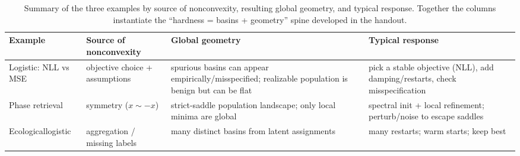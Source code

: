 \documentclass[11pt]{article}
\makeatletter
\def@path{{../../}{../}{Lecture Tex/}}
\makeatother
\begin{document}
\begin{table}[t]
  \centering
  \small
  \setlength{\tabcolsep}{4pt}
  \begin{tabular}{@{}p{}p{}p{}p{}@{}}
    \toprule
    Example & Source of nonconvexity & Global geometry & Typical response \\
    \midrule
    Logistic: NLL vs MSE & objective choice + assumptions & spurious basins can appear empirically/misspecified; realizable population is benign but can be flat & pick a stable objective (NLL), add damping/restarts, check misspecification \\
    Phase retrieval & symmetry ($x\sim -x$) & strict-saddle population landscape; only local minima are global & spectral init + local refinement; perturb/noise to escape saddles \\
    Ecological\newline logistic & aggregation / missing labels & many distinct basins from latent assignments & many restarts; warm starts; keep best \\
    \bottomrule
  \end{tabular}
  \caption{Summary of the three examples by source of nonconvexity, resulting global geometry, and typical response.
  Together the columns instantiate the ``hardness = basins + geometry'' spine developed in the handout.}
  \label{tab:nonconvex-example-summary}
\end{table}


\makeatletter
\begingroup
{}\@empty
{}
\endgroup
\makeatother

\end{document}

